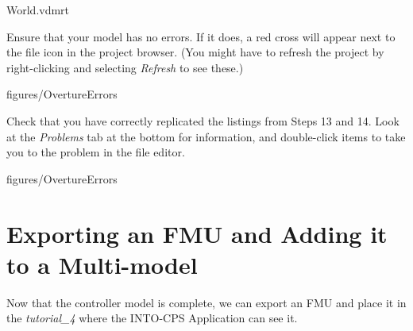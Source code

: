 \documentclass[11pt,a4paper]{../tutorial}
\begin{document}
\begin{instructions}
    \bigskip
    
    {World.vdmrt}

\item Ensure that your model has no errors. If it does, a red cross will appear next to the file icon in the project browser. (You might have to refresh the project by right-clicking and selecting \emph{Refresh} to see these.)

    \begin{annotation}[width=0.25\linewidth,trim=0 340 535 60,clip]{figures/OvertureErrors}
    \end{annotation}

    Check that you have correctly replicated the listings from Steps 13 and 14. Look at the \emph{Problems} tab at the bottom for information, and double-click items to take you to the problem in the file editor.

    \begin{annotation}[width=0.99\linewidth,trim=0 0 0 400,clip]{figures/OvertureErrors}
    \end{annotation}

\end{instructions}

\section{Exporting an FMU and Adding it to a Multi-model}

Now that the controller model is complete, we can export an FMU and place it in the \emph{tutorial\_4} where the INTO-CPS Application can see it.
\end{document}
